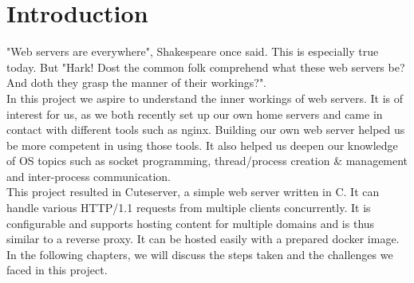 \section*{Introduction}
"Web servers are everywhere", Shakespeare once said. This is especially true today. But "Hark! Dost the common folk comprehend what these web servers be? And doth they grasp the manner of their workings?". \\ %

In this project we aspire to understand the inner workings of web servers. It is of interest for us, as we both recently set up our own home servers and came in contact with different tools such as nginx. Building our own web server helped us be more competent in using those tools. It also helped us deepen our knowledge of OS topics such as socket programming, thread/process creation \& management and inter-process communication.  \\

This project resulted in Cuteserver, a simple web server written in C. It can handle various HTTP/1.1 requests from multiple clients concurrently. It is configurable and supports hosting content for multiple domains and is thus similar to a reverse proxy. It can be hosted easily with a prepared docker image. In the following chapters, we will discuss the steps taken and the challenges we faced in this project. 

